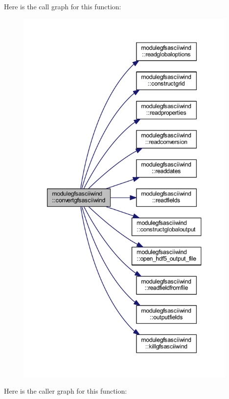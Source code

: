 Here is the call graph for this function\+:\nopagebreak
\begin{figure}[H]
\begin{center}
\leavevmode
\includegraphics[height=550pt]{namespacemodulegfsasciiwind_a4a4a0dde4375b81a03f64232de2622c5_cgraph}
\end{center}
\end{figure}
Here is the caller graph for this function\+:\nopagebreak
